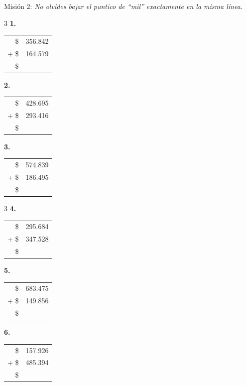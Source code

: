 \documentclass[12pt, letterpaper]{article}
\newcommand{\boxfill}[1][1.2cm]{\tcbox[on line, size=minimal, colframe=valdark!80, colback=white, boxrule=0.5pt, arc=1mm, boxsep=2pt, left=2pt, right=2pt, top=2pt, bottom=2pt]{\makebox[#1]{\vphantom{M}}}}
\begin{document}
\vspace{0.2cm}
\begin{practica}{Misión 2: }
\textit{No olvides bajar el puntico de ``mil'' exactamente en la misma línea.}

\vspace{0.4cm}
\begin{multicols}{3}
    \textbf{1.}\\
    \begin{tabular}{rr}
      \$ & 356.842 \\
    + \$ & 164.579 \\
    \hline
      \$ & \boxfill[2cm]
    \end{tabular}

    \textbf{2.}\\
    \begin{tabular}{rr}
      \$ & 428.695 \\
    + \$ & 293.416 \\
    \hline
      \$ & \boxfill[2cm]
    \end{tabular}

    \textbf{3.}\\
    \begin{tabular}{rr}
      \$ & 574.839 \\
    + \$ & 186.495 \\
    \hline
      \$ & \boxfill[2cm]
    \end{tabular}
\end{multicols}

\vspace{0.6cm}
\begin{multicols}{3}
    \textbf{4.}\\
    \begin{tabular}{rr}
      \$ & 295.684 \\
    + \$ & 347.528 \\
    \hline
      \$ & \boxfill[2cm]
    \end{tabular}

    \textbf{5.}\\
    \begin{tabular}{rr}
      \$ & 683.475 \\
    + \$ & 149.856 \\
    \hline
      \$ & \boxfill[2cm]
    \end{tabular}

    \textbf{6.}\\
    \begin{tabular}{rr}
      \$ & 157.926 \\
    + \$ & 485.394 \\
    \hline
      \$ & \boxfill[2cm]
    \end{tabular}
\end{multicols}


\end{practica}
\end{document}
